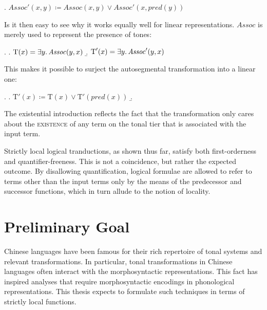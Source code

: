 \documentclass[12pt, a4paper]{report}
\newcommand{\textemph}[1]{\textsc{#1}}
\begin{document}
\ex. \(\mathit{Assoc}'(x, y) \coloneq \mathit{Assoc}(x, y) \lor
\mathit{Assoc}'(x, \mathit{pred}(y))\)

Is it then easy to see why it works equally well for linear
representations.  \(\mathit{Assoc}\) is merely used to represent the
presence of tones:

\ex.
\a. \(\text{T}(x) = \exists y\ldotp \mathit{Assoc}(y, x)\)
\b. \(\text{T}'(x) = \exists y\ldotp \mathit{Assoc}'(y, x)\)

This makes it possible to surject the autosegmental transformation
into a linear one:

\ex.
\a. \(\text{T}'(x) \coloneq
\text{T}(x) \lor \text{T}'(\mathit{pred}(x))\)
\b.
\begin{prooftree}
\end{prooftree}

The existential introduction reflects the fact that the transformation
only cares about the \textemph{existence} of any term on the tonal
tier that is associated with the input term.


Strictly local logical tranductions, as shown thus far, satisfy both
first-orderness and quantifier-freeness.  This is not a coincidence,
but rather the expected outcome.  By disallowing quantification,
logical formulae are allowed to refer to terms other than the input
terms only by the means of the predecessor and successor functions,
which in turn allude to the notion of locality.

\section{Preliminary Goal}
Chinese languages have been famous for their rich repertoire of tonal
systems and relevant transformations.  In particular, tonal
transformations in Chinese languages often interact with the
morphosyntactic representations.  This fact has inspired analyses that
require morphosyntactic encodings in phonological representations.
This thesis expects to formulate such techniques in terms of strictly
local functions.
\end{document}
